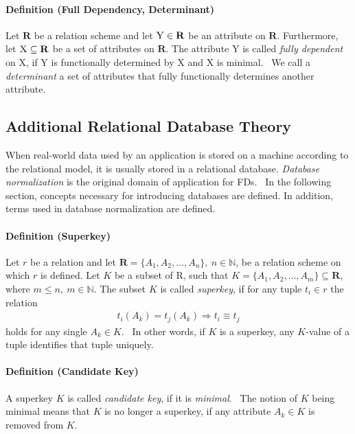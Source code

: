 \paragraph{Definition (Full Dependency, Determinant)} Let \( \mathbf{R} \) be a relation scheme and let \( \textsc{Y} \in \mathbf{R} \) be an attribute on \( \mathbf{R} \).
Furthermore, let \( \textsc{X} \subseteq \mathbf{R} \) be a set of attributes on \( \mathbf{R} \).
The attribute \textsc{Y} is called \emph{fully dependent} on \textsc{X}, if \textsc{Y} is functionally determined by \textsc{X} and \textsc{X} is minimal.~\cite[p.~61]{SCH17}
We call a \emph{determinant} a set of attributes that fully functionally determines another attribute.

\subsection{Additional Relational Database Theory}
When real-world data used by an application is stored on a machine according to the relational model, it is usually stored in a relational database.
\emph{Database normalization} is the original domain of application for FDs.~\cite[p.~381]{COD70}
In the following section, concepts necessary for introducing databases are defined.
In addition, terms used in database normalization are defined.

\paragraph{Definition (Superkey)}Let \( r \) be a relation and let \( \boldsymbol{R} = \{ A_1, A_2, \dots, A_n \},~n \in \mathbb{N} \), be a relation scheme on which \( r \) is defined.
Let \( K \) be a subset of R, such that \(K = \{ A_1, A_2, \dots, A_m \} \subseteq \boldsymbol{R} \), where \( m \leq n,~m \in \mathbb{N} \).
The subset \( K \) is called \emph{superkey}, if for any tuple \( t_i \in r \) the relation
\begin{align*}
    t_i(A_k) = t_j(A_k) \Rightarrow t_i \equiv t_j
\end{align*}
holds for any single \( A_k \in K \).~\cite[p.~4]{MAI83}
In other words, if \( K \) is a superkey, any \( K \)-value of a tuple identifies that tuple uniquely.~\cite[p.~32]{SCH17}

\paragraph{Definition (Candidate Key)} A superkey \( K \) is called \emph{candidate key}, if it is \emph{minimal}.~\cite[p.~32]{SCH17}
The notion of \( K \) being minimal means that \( K \) is no longer a superkey, if any attribute \( A_k \in K \) is removed from \( K \).

